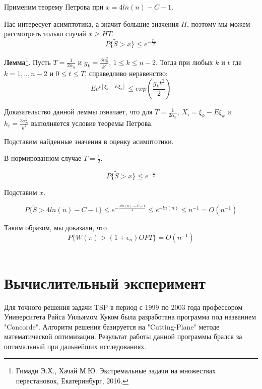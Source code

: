 \documentclass[a4paper, 14pt]{extarticle}
\numberwithin{equation}{section}
\begin{document}
Применим теорему Петрова при $x = 4ln(n) - C - 1 $.

Нас интересует асимптотика, а значит большие значения $H$, поэтому мы можем рассмотреть только случай $x \geq HT$.
\begin{equation}
P\{\tilde{S} >x \} \leq e^{-\frac{Tx}{2}}
\end{equation}

\textbf{Лемма}\footnote{ Гимади Э.Х., Хачай М.Ю. Экстремальные задачи на множествах перестановок, Екатеринбург, 2016.}. Пусть $T = \frac{1}{2\alpha_n}$ и $g_k = \frac{3\alpha_n^2}{k^2}$, $1 \leq k \leq n-2$. Тогда при любых $k$ и $t$ где $k=1,..,n-2$ и $0 \leq t \leq T$, справедливо неравенство:
\begin{equation}
Ee^{t[\xi_k-E\xi_k]} \leq exp(\frac{g_k t^2}{2})
\end{equation}


Доказательство данной леммы означает, что для $T = \frac{1}{2\alpha_n}$, $X_i = \xi_k-E\xi_k$ и $h_i = \frac{3\alpha_n^2}{k^2}$ выполняется условие теоремы Петрова.

Подставим найденные значения в оценку асимптотики.

В нормированном случае $T = \frac{1}{2}$.

\begin{equation}
P\{\tilde{S} >x \} \leq e^{-\frac{x}{4}}
\end{equation}

Подставим $x$.

\begin{equation}
P\{\tilde{S} >4ln(n) - C - 1 \} \leq e^{-\frac{4ln(n) - C - 1}{4}} \leq e^{-ln(n)} \leq n^{-1} = O(n^{-1})
\end{equation}

Таким образом, мы доказали, что
\begin{equation}
P\{ W(\pi)>(1+\epsilon_n)OPT \} = O(n^{-1})
\end{equation}\\



\section{Вычислительный эксперимент}


Для точного решения задачи TSP в период с 1999 по 2003 года профессором Университета Райса Уильямом Куком была разработана программа под названием "Concorde". Алгоритм решения базируется на "Cutting-Plane" методе математической оптимизации. Результат работы данной программы брался за оптимальный при дальнейших исследованиях.
\end{document}
